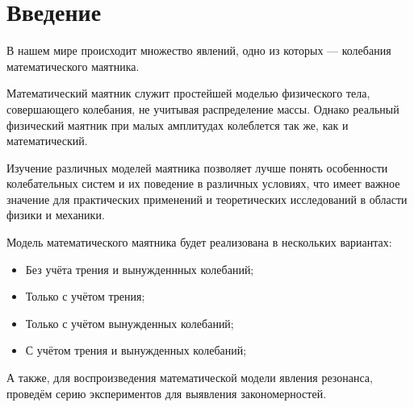 \pagebreak

\section{Введение}
	В нашем мире происходит множество явлений, одно из которых — колебания математического маятника. 

	Математический маятник служит простейшей моделью физического тела, совершающего колебания, не учитывая распределение массы. Однако реальный физический маятник при малых амплитудах колеблется так же, как и математический.

	Изучение различных моделей маятника позволяет лучше понять особенности колебательных систем и их поведение в различных условиях, что имеет важное значение для практических применений и теоретических исследований в области физики и механики.

	Модель математического маятника будет реализована в нескольких вариантах:
	\begin{itemize}
		\item Без учёта трения и вынужденнных колебаний;
		\item Только с учётом трения;
		\item Только с учётом вынужденных колебаний;
		\item С учётом трения и вынужденных колебаний;
	\end{itemize}

	А также, для воспроизведения математической модели явления резонанса, проведём серию экспериментов для выявления закономерностей.

\pagebreak